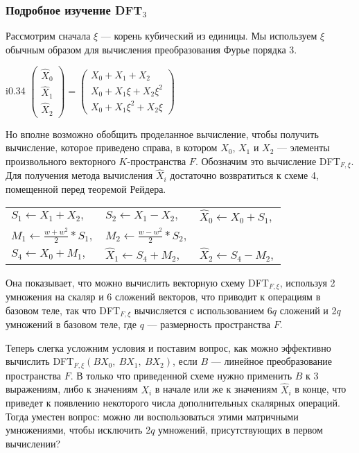 \documentclass{mai_book}
\begin{document}
\subsubsection{Подробное изучение D{\footnotesize FT}$_3$}
Рассмотрим сначала $\xi$ --- корень кубический из единицы. Мы используем $\xi$ обычным образом для вычисления преобразования Фурье порядка 3.
\begin{wrapfigure}{i}{0.34\textwidth}
$\begin{pmatrix} \hat{X}_0 \\ \hat{X}_1 \\ \hat{X}_2 \end{pmatrix} = \begin{pmatrix} X_0+X_1+X_2 \\ X_0+X_1 \xi +X_2 \xi^2 \\ X_0+X_1 \xi^2 +X_2 \xi \end{pmatrix}$
  \end{wrapfigure}
Но вполне возможно обобщить проделанное вычисление, чтобы получить вычисление, которое приведено справа, в котором $X_0$, $X_1$ и $X_2$ --- элементы произвольного векторного $K$-пространства $F$. Обозначим это вычисление D{\footnotesize FT}$_{F, \xi}$. Для получения метода вычисления $\hat{X}_i$ достаточно возвратиться к схеме 4, помещенной перед теоремой Рейдера.\par
  \begin{center}
\begin{tabular}{|lll|}
  \hline
  $S_1 \leftarrow X_1+X_2,$ & $S_2 \leftarrow X_1-X_2,$ & $\hat{X}_0 \leftarrow X_0+S_1,$
  \\
  $M_1 \leftarrow \frac{w+w^2}{2} * S_1,$ & $M_2 \leftarrow \frac{w-w^2}{2} * S_2,$ & 
  \\
  $S_4 \leftarrow X_0+M_1,$ & $\hat{X}_1 \leftarrow S_4+M_2,$ & $\hat{X}_2 \leftarrow S_4-M_2,$
  \\
  \hline
\end{tabular}
  \end{center}
  \par
Она показывает, что можно вычислить векторную схему D{\footnotesize FT}$_{F, \xi}$, используя 2 умножения на скаляр и 6 сложений векторов, что приводит к операциям в базовом теле, так что D{\footnotesize FT}$_{F, \xi}$ вычисляется с использованием 6$q$ сложений и 2$q$ умножений в базовом теле, где $q$ --- размерность пространства $F$.\par
Теперь слегка усложним условия и поставим вопрос, как можно эффективно вычислить D{\footnotesize FT}$_{F, \xi}(BX_0,\ BX_1,\ BX_2)$, если $B$ --- линейное преобразование пространства $F$. В только что приведенной схеме нужно применить $B$ к 3 выражениям, либо к значениям $X_i$ в начале или же к значениям $\hat{X}_i$ в конце, что приведет к появлению некоторого числа дополнительных скалярных операций. Тогда уместен вопрос: можно ли воспользоваться этими матричными умножениями, чтобы исключить 2$q$ умножений, присутствующих в первом вычислении?\par
\end{document}
